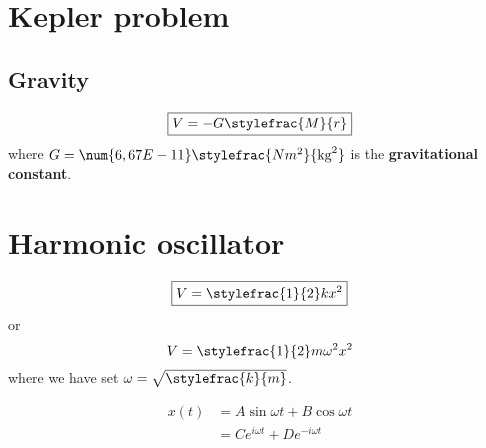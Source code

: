 \section{Kepler problem}
\subsection{Gravity}

	\begin{formula}
		\begin{equation}
	        	\label{forces:gravity:potential}
			\boxed{V = -G\stylefrac{M}{r}}
		\end{equation}
	        where $G = \num{6,67E-11}\stylefrac{Nm^2}{\text{kg}^2}$ is the \textbf{gravitational constant}.
	\end{formula}
    
    
\section{Harmonic oscillator}

	\begin{formula}
		\begin{equation}
	        	\label{forces:harmonic_oscillator:potential}
			\boxed{V = \stylefrac{1}{2}kx^2}
		\end{equation}
		or
	        \begin{equation}
        		\label{forces:harmonic_oscillator:potential_2}
			V = \stylefrac{1}{2}m\omega^2x^2
		\end{equation}
        	where we have set $\omega = \sqrt{\stylefrac{k}{m}}$.
	\end{formula}
    
	\begin{formula}[Solution]
		\begin{align}
        		\label{forces:harmonic_oscillator:solution}
			x(t) &= A\sin\omega t + B\cos\omega t\\
			&=Ce^{i\omega t} + De^{-i\omega t}
		\end{align}
	\end{formula}
